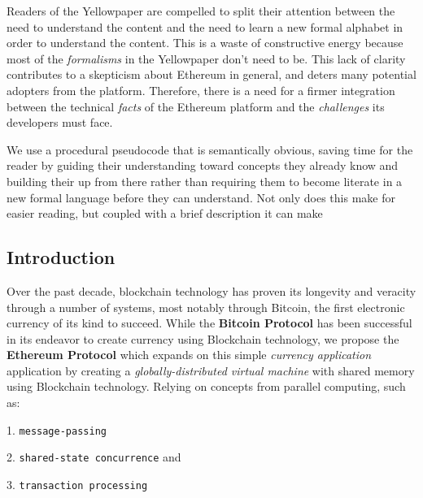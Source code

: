 \documentclass[11pt,a4paper,leqno,bibliography=totoc]{scrartcl}
\newenvironment{alphafootnotes}
    {\par\edef\savedfootnotenumber{\number\value{footnote}}
    \renewcommand{\thefootnote}{\alph{footnote}}
     \setcounter{footnote}{0}}
    {\par\setcounter{footnote}{\savedfootnotenumber}}
\begin{document}
\begin{alphafootnotes}
	  Readers of the Yellowpaper are compelled to split their attention between the need to understand the content and the need to learn a new formal alphabet in order to understand the content. This is a waste of constructive energy because most of the \textit{formalisms} in the Yellowpaper don't need to be. This lack of clarity contributes to a skepticism about Ethereum in general, and deters many potential adopters from the platform. Therefore, there is a need for a firmer integration between the technical \textsl{facts} of the Ethereum platform and the \textsl{challenges} its developers must face.
\par

	We use a procedural pseudocode that is semantically obvious, saving time for the reader by guiding their understanding toward concepts they already know and building their up from there rather than requiring them to become literate in a new formal language before they can understand. Not only does this make for easier reading, but coupled with a brief description it can make
\begin{multicols}{2}
\justify

	\section{Introduction}Over the past decade, blockchain technology has proven its longevity and veracity through a number of systems, most notably through Bitcoin, the first electronic currency of its kind to succeed. While the \textbf{Bitcoin Protocol} has been successful in its endeavor to create currency using Blockchain technology, we propose the \textbf{Ethereum Protocol} which expands on this simple \textsl{currency application} application by creating a \textit{globally-distributed virtual machine} with shared memory using Blockchain technology. Relying on concepts from parallel computing, such as:


1. \texttt{message-passing} \par
2. \texttt{shared-state concurrence} and \par
3. \texttt{transaction processing} \par



\end{multicols}
\end{alphafootnotes}
\end{document}

